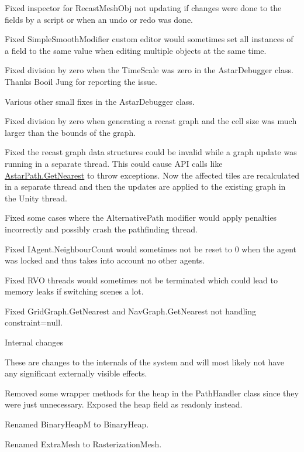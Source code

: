 \begin{DoxyItemize}
\begin{DoxyItemize}
\begin{DoxyItemize}
\item Fixed inspector for Recast\+Mesh\+Obj not updating if changes were done to the fields by a script or when an undo or redo was done.
\item Fixed Simple\+Smooth\+Modifier custom editor would sometimes set all instances of a field to the same value when editing multiple objects at the same time.
\item Fixed division by zero when the Time\+Scale was zero in the Astar\+Debugger class. Thanks Booil Jung for reporting the issue.
\item Various other small fixes in the Astar\+Debugger class.
\item Fixed division by zero when generating a recast graph and the cell size was much larger than the bounds of the graph.
\item Fixed the recast graph data structures could be invalid while a graph update was running in a separate thread. This could cause A\+PI calls like \mbox{\hyperlink{class_astar_path_a7d49736e7a25f4cf9fc24bdbec862359}{Astar\+Path.\+Get\+Nearest}} to throw exceptions. Now the affected tiles are recalculated in a separate thread and then the updates are applied to the existing graph in the Unity thread.
\item Fixed some cases where the Alternative\+Path modifier would apply penalties incorrectly and possibly crash the pathfinding thread.
\item Fixed I\+Agent.\+Neighbour\+Count would sometimes not be reset to 0 when the agent was locked and thus takes into account no other agents.
\item Fixed R\+VO threads would sometimes not be terminated which could lead to memory leaks if switching scenes a lot.
\item Fixed Grid\+Graph.\+Get\+Nearest and Nav\+Graph.\+Get\+Nearest not handling constraint=null.
\end{DoxyItemize}
\item Internal changes
\begin{DoxyItemize}
\item These are changes to the internals of the system and will most likely not have any significant externally visible effects.
\item Removed some wrapper methods for the heap in the Path\+Handler class since they were just unnecessary. Exposed the heap field as readonly instead.
\item Renamed Binary\+HeapM to Binary\+Heap.
\item Renamed Extra\+Mesh to Rasterization\+Mesh.

\end{DoxyItemize}
\end{DoxyItemize}
\end{DoxyItemize}
